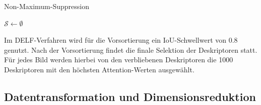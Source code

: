 \begin{algorithm}
\caption{Non-Maximum-Suppression}
\label{nms}
\DontPrintSemicolon
{}
$\mathcal{S} \leftarrow \emptyset$ \;

\end{algorithm}
Im DELF-Verfahren wird für die Vorsortierung ein IoU-Schwellwert von $0.8$ genutzt. Nach der Vorsortierung findet die finale Selektion der Deskriptoren statt. Für jedes Bild werden hierbei von den verbliebenen Deskriptoren die 1000 Deskriptoren mit den höchsten Attention-Werten ausgewählt.

\subsection{Datentransformation und Dimensionsreduktion}\label{pca_chapter}

